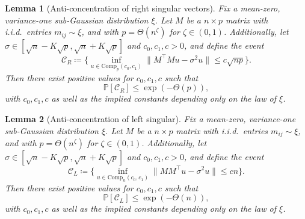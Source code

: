 \documentclass[10pt,a4paper]{amsart}
\newtheorem{lemma}{Lemma}
\newcommand{\Comp}{\mathrm{Comp}}
\begin{document}
\begin{lemma}[Anti-concentration of right singular vectors]\label{lem-incompressible-fixed-val-right}
    Fix a mean-zero, variance-one sub-Gaussian distribution $\xi$. Let $M$ be a $n \times p$ matrix with i.i.d.\ entries $m_{ij} \sim \xi$, and with $p = \Theta(n^{\zeta})$ for $\zeta \in (0, 1)$. Additionally, let $\sigma \in [\sqrt{n} - K\sqrt{p}, \sqrt{n} + K\sqrt{p}]$ and $c_0, c_1, c > 0$, and define the event
    \begin{equation}\label{eq-incompressible-fixed-val-1}
        \mathcal{C}_R \coloneqq \bigg\{ \inf_{u \in \Comp_p(c_0, c_1)}\| M^\top M u - \sigma^2 u \| \leq c \sqrt{np} \bigg\}.
    \end{equation}
    Then there exist positive values for $c_0, c_1, c$ such that
    \begin{equation}\label{eq-incompressible-fixed-val-3}
        \mathbb{P}[\mathcal{C}_R] \leq \exp(- \Theta(p)),
    \end{equation}
    with $c_0, c_1, c$ as well as the implied constants depending only on the law of $\xi$.
\end{lemma}

\begin{lemma}[Anti-concentration of left singular]\label{lem-incompressible-fixed-val-left}
    Fix a mean-zero, variance-one sub-Gaussian distribution $\xi$. Let $M$ be a $n \times p$ matrix with i.i.d.\ entries $m_{ij} \sim \xi$, and with $p = \Theta(n^{\zeta})$ for $\zeta \in (0, 1)$. Additionally, let $\sigma \in [\sqrt{n} - K\sqrt{p}, \sqrt{n} + K\sqrt{p}]$ and $c_0, c_1, c > 0$, and define the event
    \begin{equation}
        \mathcal{C}_L \coloneqq \bigg\{ \inf_{u \in \Comp_n(c_0, c_1)}\|M M^\top u - \sigma^2 u\| \leq c n \bigg\}.
    \end{equation}
    Then there exist positive values for $c_0, c_1, c$ such that
    \begin{equation}
        \mathbb{P}[\mathcal{C}_L] \leq \exp(- \Theta(n)),
    \end{equation}
    with $c_0, c_1, c$ as well as the implied constants depending only on the law of $\xi$.
\end{lemma}
\end{document}
